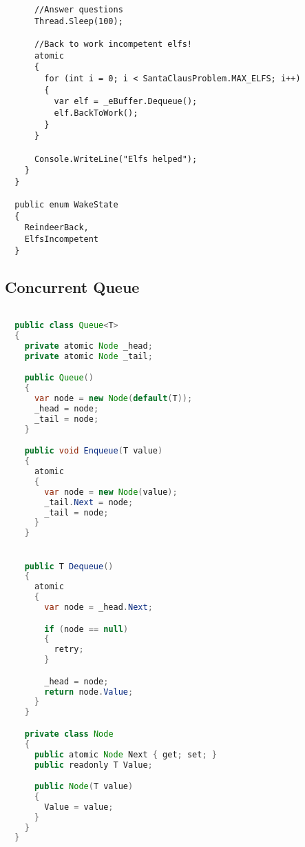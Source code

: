 \begin{lstlisting}
      //Answer questions
      Thread.Sleep(100);

      //Back to work incompetent elfs!
      atomic
      {
        for (int i = 0; i < SantaClausProblem.MAX_ELFS; i++)
        {
          var elf = _eBuffer.Dequeue();
          elf.BackToWork();
        }
      }

      Console.WriteLine("Elfs helped");
    }
  }

  public enum WakeState
  {
    ReindeerBack,
    ElfsIncompetent
  }

\end{lstlisting}
\subsection{Concurrent Queue}
\begin{lstlisting}[label=lst:impl_dining_lib,
  caption={Lock Based Concurrent Hashmap Implementation},
  language=Java,  
  showspaces=false,
  showtabs=false,
  breaklines=true,
  showstringspaces=false,
  breakatwhitespace=true,
  commentstyle=\color{greencomments},
  keywordstyle=\color{bluekeywords},
  stringstyle=\color{redstrings},
  escapechar=~,
  morekeywords={atomic, retry, orelse, var, get, set, ref, out, readonly, virtual, override, region, endregion, foreach, lock}]  % Start your code-block

  public class Queue<T>
  {
    private atomic Node _head;
    private atomic Node _tail;

    public Queue()
    {
      var node = new Node(default(T));
      _head = node;
      _tail = node;
    }

    public void Enqueue(T value)
    {
      atomic
      {
        var node = new Node(value);
        _tail.Next = node;
        _tail = node;
      }
    }


    public T Dequeue()
    {
      atomic
      {
        var node = _head.Next;

        if (node == null)
        {
          retry;
        }

        _head = node;
        return node.Value;
      }
    }

    private class Node
    {
      public atomic Node Next { get; set; }
      public readonly T Value;

      public Node(T value)
      {
        Value = value;
      }
    }
  }

\end{lstlisting}
